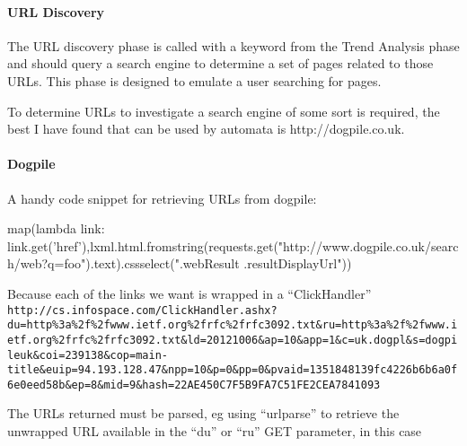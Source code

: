 \paragraph{URL Discovery}
The URL discovery phase is called with a keyword from the Trend Analysis phase and should query a search engine to determine a set of pages related to those URLs. This phase is designed to emulate a user searching for pages.

To determine URLs to investigate a search engine of some sort is required, the best I have found that can be used by automata is http://dogpile.co.uk.

\paragraph{Dogpile}

A handy code snippet for retrieving URLs from dogpile:

map(lambda link: link.get('href'),lxml.html.fromstring(requests.get("http://www.dogpile.co.uk/search/web?q=foo").text).cssselect(".webResult .resultDisplayUrl"))

Because each of the links we want is wrapped in a ``ClickHandler'' \verb`http://cs.infospace.com/ClickHandler.ashx?du=http%3a%2f%2fwww.ietf.org%2frfc%2frfc3092.txt&ru=http%3a%2f%2fwww.ietf.org%2frfc%2frfc3092.txt&ld=20121006&ap=10&app=1&c=uk.dogpl&s=dogpileuk&coi=239138&cop=main-title&euip=94.193.128.47&npp=10&p=0&pp=0&pvaid=1351848139fc4226b6b6a0f6e0eed58b&ep=8&mid=9&hash=22AE450C7F5B9FA7C51FE2CEA7841093`

The URLs returned must be parsed, eg using ``urlparse'' to retrieve the unwrapped URL available in the ``du'' or ``ru'' GET parameter, in this case\cite{rfc3092}